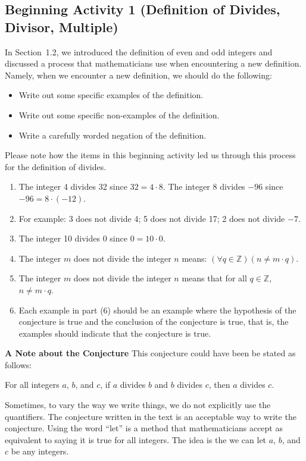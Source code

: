 \documentclass[11pt]{article}
\begin{document}
\subsection*{Beginning Activity 1 (Definition of Divides, Divisor, Multiple)}
In Section~1.2, we introduced the definition of even and odd integers and discussed a process that mathematicians use when encountering a new definition.  Namely, 
when we encounter a new definition, we should do the following:
\begin{itemize}
  \item Write out some specific examples of the definition.
  \item Write out some specific non-examples of the definition.
  \item Write a carefully worded negation of the definition.
\end{itemize}
Please note how the items in this beginning activity led us through this process for the definition of divides.

\begin{enumerate} 
  \item The integer 4 divides 32 since $32 = 4 \cdot 8$.  The integer 8 divides $-96$ since 
          $-96 = 8 \cdot (-12)$.
  \item For example:  3 does not divide 4; 5 does not divide 17; 2 does not divide $-7$.
  \item The integer 10 divides 0 since $0 = 10 \cdot 0$.

  \item The integer  $m$  does not divide the integer  $n$  means:  
          $\left( {\forall q \in \mathbb{Z}} \right)\left( {n \ne m \cdot q} \right)$.

\item The integer  $m$  does not divide the integer  $n$  means that for all  
$q \in \mathbb{Z}$, $n \ne m \cdot q$.
\addtocounter{enumi}{1}
\item Each example in part (6) should be an example where the hypothesis of the conjecture is true and the conclusion of the conjecture is true, that is, the examples should indicate that the conjecture is true.
\end{enumerate}

\noindent
\textbf{A Note about the Conjecture}
This conjecture could have been be stated as follows:

\vskip6pt
For all integers $a$, $b$, and  $c$, if $a$ divides $b$ and $b$ divides $c$, then $a$ divides $c$.
\vskip6pt

\noindent
Sometimes, to vary the way we write things, we do not explicitly use the quantifiers.  The conjecture written in the text is an acceptable way to write the conjecture.  Using the word ``let'' is a method that mathematicians accept as equivalent to saying it is true for all integers.  
The idea is the we can let $a$, $b$, and  $c$  be any integers.
\end{document}
